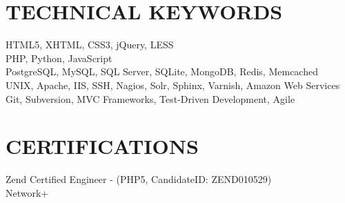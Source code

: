 \documentclass{res}
\begin{document}
\begin{resume}
\section{TECHNICAL KEYWORDS}  

    HTML5, XHTML, CSS3, jQuery, LESS \\
    PHP, Python, JavaScript \\
    PostgreSQL, MySQL, SQL Server, SQLite, MongoDB, Redis, Memcached \\
    UNIX, Apache, IIS, SSH, Nagios, Solr, Sphinx, Varnish, Amazon Web Services \\
    Git, Subversion, MVC Frameworks, Test-Driven Development, Agile

 
\section{CERTIFICATIONS}
    Zend Certified Engineer - (PHP5, CandidateID: ZEND010529) \\
    Network+
 
\end{resume}
\end{document}
